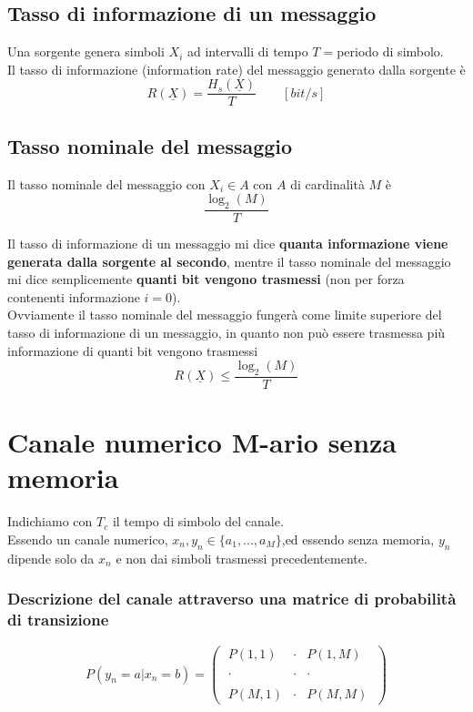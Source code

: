 \documentclass{article}
\begin{document}
\subsection{Tasso di informazione di un messaggio}
Una sorgente genera simboli $X_i$ ad intervalli di tempo $T=$periodo di simbolo.\\
Il tasso di informazione (information rate) del messaggio generato dalla sorgente è $$R(\underline{X})=\frac{H_s(\underline{X})}{T}\qquad[bit/s]$$

\subsection{Tasso nominale del messaggio}
Il tasso nominale del messaggio con $X_i\in A$ con $A$ di cardinalità $M$ è $$\frac{\log_2(M)}{T}$$

Il tasso di informazione di un messaggio mi dice \textbf{quanta informazione viene generata dalla sorgente al secondo}, mentre il tasso nominale del messaggio mi dice semplicemente \textbf{quanti bit vengono trasmessi} (non per forza contenenti informazione $i=0$).\\
Ovviamente il tasso nominale del messaggio fungerà come limite superiore del tasso di informazione di un messaggio, in quanto non può essere trasmessa più informazione di quanti bit vengono trasmessi
$$R(\underline{X})\leq \frac{\log_2(M)}{T}$$








\newpage
\section{Canale numerico M-ario senza memoria}
Indichiamo con $T_c$ il tempo di simbolo del canale.\\
Essendo un canale numerico, $x_n, y_n\in\{a_1,...,a_M\}$,ed essendo senza memoria, $y_n$ dipende solo da $x_n$ e non dai simboli trasmessi precedentemente.\\

\subsubsection{Descrizione del canale attraverso una matrice di probabilità di transizione}
$$P(y_n=a|x_n=b)=\left(\;\begin{array}{ccc}
	P(1,1)&\cdot&P(1,M)\\\\
	\cdot&\cdot&\cdot\\\\
	P(M,1)&\cdot&P(M,M)
\end{array}\;\right)$$
\end{document}
